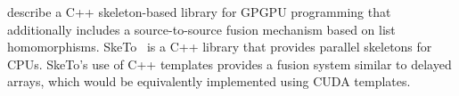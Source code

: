 \citet{Sato:2009cq} describe a C++ skeleton-based library for GPGPU programming
that additionally includes a source-to-source fusion mechanism based on list
homomorphisms. SkeTo~\cite{Matsuzaki:2011ew} is a C++ library that provides
parallel skeletons for CPUs. SkeTo's use of C++ templates provides a fusion
system similar to delayed arrays, which would be equivalently implemented using
CUDA templates.




%
%
%
%
%
%
